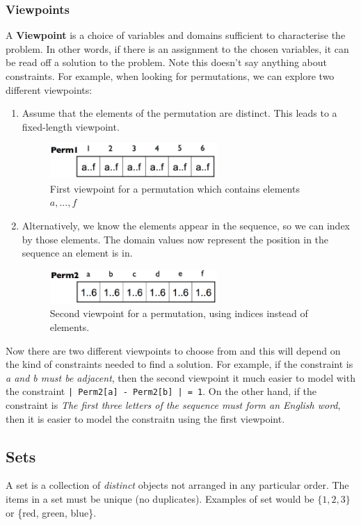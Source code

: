 \documentclass[CS4402-Notes.tex]{subfiles}
\begin{document}
\subsubsection{Viewpoints}
A \textbf{Viewpoint} is a choice of variables and domains sufficient to characterise the problem. In other words, if there is an assignment to the chosen variables, it can be read off a solution to the problem. Note this doesn't say anything about constraints.
\n
For example, when looking for permutations, we can explore two different viewpoints:
\begin{enumerate}
\item Assume that the elements of the permutation are distinct. This leads to a fixed-length viewpoint.
  \begin{figure}[H]
  \centering
  \includegraphics[width=0.6\textwidth, keepaspectratio]{imgs/perm1.png}
  \caption{First viewpoint for a permutation which contains elements $a, ..., f$}
  \end{figure}
\item Alternatively, we know the elements appear in the sequence, so we can index by those elements. The domain values now represent the position in the sequence an element is in.
  \begin{figure}[H]
  \centering
  \includegraphics[width=0.6\textwidth, keepaspectratio]{imgs/perm2.png}
  \caption{Second viewpoint for a permutation, using indices instead of elements.}
  \end{figure}
\end{enumerate}
Now there are two different viewpoints to choose from and this will depend on the kind of constraints needed to find a solution. For example, if the constraint is \textit{a and b must be adjacent}, then the second viewpoint it much easier to model with the constraint \texttt{| Perm2[a] - Perm2[b] | = 1}. On the other hand, if the constraint is \textit{The first three letters of the sequence must form an English word}, then it is easier to model the constraitn using the first viewpoint.

\subsection{Sets}
A set is a collection of \textit{distinct} objects not arranged in any particular order. The items in a set must be unique (no duplicates). Examples of set would be $\{1, 2, 3\}$ or \{red, green, blue\}.
\end{document}
